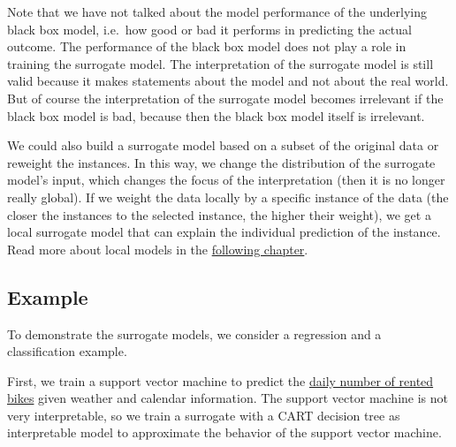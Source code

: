 \documentclass[12pt,]{krantz}
\begin{document}
Note that we have not talked about the model performance of the
underlying black box model, i.e.~how good or bad it performs in
predicting the actual outcome. The performance of the black box model
does not play a role in training the surrogate model. The interpretation
of the surrogate model is still valid because it makes statements about
the model and not about the real world. But of course the interpretation
of the surrogate model becomes irrelevant if the black box model is bad,
because then the black box model itself is irrelevant.

We could also build a surrogate model based on a subset of the original
data or reweight the instances. In this way, we change the distribution
of the surrogate model's input, which changes the focus of the
interpretation (then it is no longer really global). If we weight the
data locally by a specific instance of the data (the closer the
instances to the selected instance, the higher their weight), we get a
local surrogate model that can explain the individual prediction of the
instance. Read more about local models in the
\protect\hyperlink{lime}{following chapter}.

\subsection{Example}\label{example-3}

To demonstrate the surrogate models, we consider a regression and a
classification example.

First, we train a support vector machine to predict the
\protect\hyperlink{bike-data}{daily number of rented bikes} given
weather and calendar information. The support vector machine is not very
interpretable, so we train a surrogate with a CART decision tree as
interpretable model to approximate the behavior of the support vector
machine.
\end{document}

